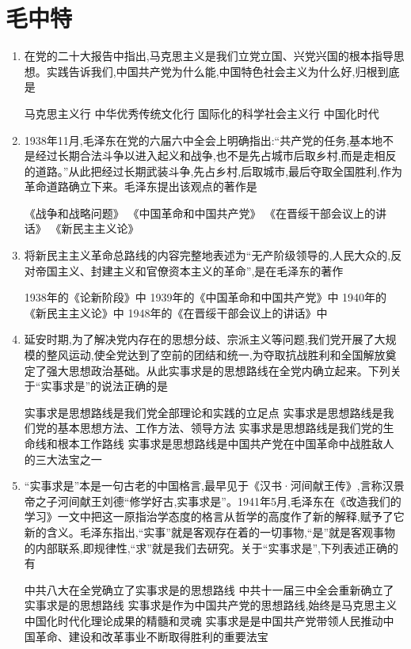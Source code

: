 \documentclass[12pt, a4paper, oneside, UTF8]{ctexbook}
\begin{document}
\section{毛中特}
\begin{enumerate}
    \item 在党的二十大报告中指出,马克思主义是我们立党立国、兴党兴国的根本指导思想。实践告诉我们,中国共产党为什么能,中国特色社会主义为什么好,归根到底是
    \begin{choices}[1]
    \task 马克思主义行
    \task 中华优秀传统文化行
    \task 国际化的科学社会主义行
    \task 中国化时代
    \end{choices}

    \item 1938年11月,毛泽东在党的六届六中全会上明确指出:“共产党的任务,基本地不是经过长期合法斗争以进入起义和战争,也不是先占城市后取乡村,而是走相反的道路。”从此把经过长期武装斗争,先占乡村,后取城市,最后夺取全国胜利,作为革命道路确立下来。毛泽东提出该观点的著作是
    \begin{choices}[1]
    \task 《战争和战略问题》
    \task 《中国革命和中国共产党》
    \task 《在晋绥干部会议上的讲话》
    \task 《新民主主义论》
    \end{choices}

    
    \item 将新民主主义革命总路线的内容完整地表述为“无产阶级领导的,人民大众的,反对帝国主义、封建主义和官僚资本主义的革命”,是在毛泽东的著作
    \begin{choices}[1]
    \task 1938年的《论新阶段》中
    \task 1939年的《中国革命和中国共产党》中
    \task 1940年的《新民主主义论》中
    \task 1948年的《在晋绥干部会议上的讲话》中
    \end{choices}

    
    \item 延安时期,为了解决党内存在的思想分歧、宗派主义等问题,我们党开展了大规模的整风运动,使全党达到了空前的团结和统一,为夺取抗战胜利和全国解放奠定了强大思想政治基础。从此实事求是的思想路线在全党内确立起来。下列关于“实事求是”的说法正确的是
    \begin{choices}[1]
    \task 实事求是思想路线是我们党全部理论和实践的立足点
    \task 实事求是思想路线是我们党的基本思想方法、工作方法、领导方法
    \task 实事求是思想路线是我们党的生命线和根本工作路线
    \task 实事求是思想路线是中国共产党在中国革命中战胜敌人的三大法宝之一
    \end{choices}

    
    \item “实事求是”本是一句古老的中国格言,最早见于《汉书·河间献王传》,言称汉景帝之子河间献王刘德“修学好古,实事求是”。1941年5月,毛泽东在《改造我们的学习》一文中把这一原指治学态度的格言从哲学的高度作了新的解释,赋予了它新的含义。毛泽东指出,“实事”就是客观存在着的一切事物,“是”就是客观事物的内部联系,即规律性,“求”就是我们去研究。关于“实事求是”,下列表述正确的有
    \begin{choices}[1]
    \task 中共八大在全党确立了实事求是的思想路线
    \task 中共十一届三中全会重新确立了实事求是的思想路线
    \task 实事求是作为中国共产党的思想路线,始终是马克思主义中国化时代化理论成果的精髓和灵魂
    \task 实事求是是中国共产党带领人民推动中国革命、建设和改革事业不断取得胜利的重要法宝
    \end{choices}


\end{enumerate}
\end{document}
